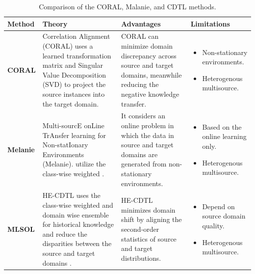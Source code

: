 \begin{table}[!ht]
    \centering
    \caption{Comparison of the CORAL, Malanie, and CDTL methods.}
    \label{table:transfer}
    \small %
    \renewcommand{\arraystretch}{1} %
    \setlength{\tabcolsep}{4pt} %
    \setlength{\arrayrulewidth}{0.15mm}
    \begin{tabularx}{\textwidth}{|>{\centering\arraybackslash\bfseries}p{2cm}|
                                       >{\raggedright\arraybackslash}X|
                                       >{\raggedright\arraybackslash}X|
                                       >{\raggedright\arraybackslash}X|}
    \hline
    \textbf{Method} & \textbf{Theory} & \textbf{Advantages} & \textbf{Limitations} \\ 
    \hline
    \textbf{CORAL} & 
    Correlation Alignment (CORAL) uses a learned transformation matrix and Singular Value Decomposition (SVD)  to project the source instances into the target domain. & 
    CORAL can minimize domain discrepancy across
source and target domains, meanwhile reducing the negative
knowledge transfer. & 
    \begin{itemize}[leftmargin=*]
        \item Non-stationary environments.
        \item Heterogenous multisource.
    \end{itemize} \\ 
    \hline
    \textbf{Melanie} & 
    Multi-sourcE onLine TrAnsfer
learning for Non-statIonary Environments (Melanie). utilize the class-wise weighted . & 
It considers
an online problem in which the data in source and target
domains are generated from non-stationary environments. & 
    \begin{itemize}[leftmargin=*]
        \item Based on the online learning  only.
        \item Heterogenous multisource.
    \end{itemize} \\
    \hline
    \textbf{MLSOL} & 
    HE-CDTL uses the class-wise weighted and domain wise ensemble for historical knowledge and reduce the disparities between the source and target domains . & 
    HE-CDTL minimizes domain shift by aligning the second-order statistics of source and target distributions. & 
    \begin{itemize}[leftmargin=*]
        \item Depend on source domain quality.
        \item Heterogenous multisource.
    \end{itemize} \\
    \hline
    \end{tabularx}
    \end{table}
